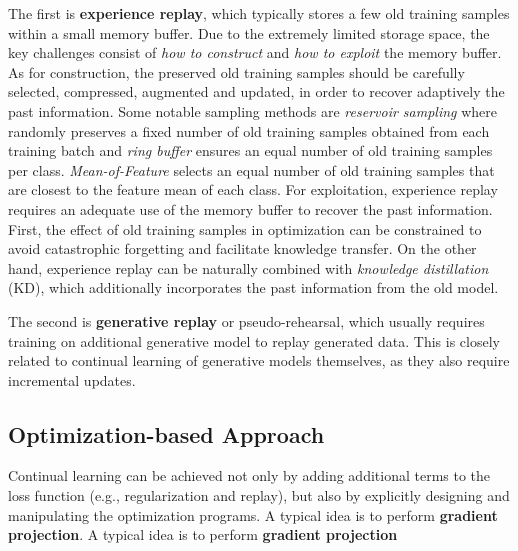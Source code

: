 The first is \textbf{experience replay}, which typically stores a few old training samples within a small memory buffer. Due to the extremely limited storage space, the key challenges consist of \textit{how to construct} and \textit{how to exploit} the memory buffer.  As for construction, the preserved old training samples should be carefully selected, compressed, augmented and updated, in order to recover adaptively the past information.  Some notable sampling methods are \textit{reservoir sampling} where randomly preserves a fixed number of old training samples obtained from each training batch and \textit{ring buffer} ensures an equal number of old training samples per class.  \textit{Mean-of-Feature} selects an equal number of old training samples that are closest to the feature mean of each class.  For exploitation, experience replay requires an adequate use of the memory buffer to recover the past information.  First, the effect of old training samples in optimization can be constrained to avoid catastrophic forgetting and facilitate knowledge transfer.  On the other hand, experience replay can be naturally combined with \textit{knowledge distillation} (KD), which additionally incorporates the past information from the old model.

The second is \textbf{generative replay} or pseudo-rehearsal, which usually requires training on additional generative model to replay generated data. This is closely related to continual learning of generative models themselves, as they also require incremental updates.

\subsection{Optimization-based Approach}
Continual learning can be achieved not only by adding additional terms to the loss function (e.g., regularization and replay), but also by explicitly designing and manipulating the optimization programs. A typical idea is to perform \textbf{gradient projection}.  A typical idea is to perform \textbf{gradient projection}